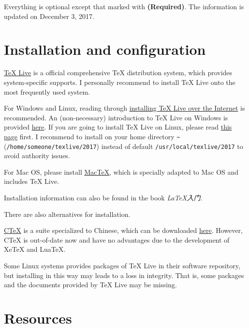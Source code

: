 \documentclass[english]{pkupaper}
\title{\titlemark}
\author{pppppass}
\date{\today}
\begin{document}
	\maketitle

Everything is optional except that marked with \textbf{(Required)}. The information is updated on December 3, 2017.

\section{Installation and configuration}

\href{http://www.tug.org/texlive/}{TeX Live} is a official comprehensive TeX distribution system, which provides system-specific supports. I personally recommend to install TeX Live onto the most frequently used system.

For Windows and Linux, reading through \href{http://www.tug.org/texlive/acquire-netinstall.html}{installing TeX Live over the Internet} is recommended. An (non-necessary) introduction to TeX Live on Windows is provided \href{http://www.tug.org/texlive/windows.html}{here}. If you are going to install TeX Live on Linux, please read \href{http://www.tug.org/texlive/quickinstall.html}{this page} first. I recommend to install on your home directory \verb"~" (\verb"/home/someone/texlive/2017") instead of default \verb"/usr/local/texlive/2017" to avoid authority issues.

For Mac OS, please install \href{http://www.tug.org/mactex/}{MacTeX}, which is specially adapted to Mac OS and includes TeX Live.

Installation information can also be found in the book \emph{\LaTeX 入门}.

There are also alternatives for installation.

\href{http://www.ctex.org/CTeX}{CTeX} is a suite specialized to Chinese, which can be downloaded \href{http://www.ctex.org/CTeXDownload}{here}. However, CTeX is out-of-date now and have no advantages due to the development of XeTeX and LuaTeX.

Some Linux systems provides packages of TeX Live in their software repository, but installing in this way may leads to a loss in integrity. That is, some packages and the documents provided by TeX Live may be missing.

\section{Resources}
\end{document}
